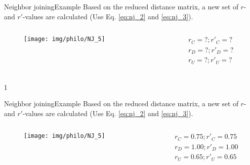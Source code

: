 \documentclass[10pt]{beamer}
\def\mysol{0}
\def\mysol{1}
\newcommand{\1}{
	\setbeamertemplate{background}{
		\texttt{[image: img/1]}
		\tikz[overlay] \fill[fill opacity=0.75,fill=white] (0,0) rectangle (-\paperwidth,\paperheight);
	}
}
\begin{document}
\begin{frame}{Neighbor joining}{Example}
	Based on the reduced distance matrix, a new set of $r$- and $r'$-values	are calculated (Use Eq. \ref{eq:nj_2} and \ref{eq:nj_3}). 
	
	\begin{columns}
		\begin{column}{0.48\textwidth}
			\begin{figure}
				\texttt{[image: img/philo/NJ\_5]}
			\end{figure}
		\end{column}
		\begin{column}{0.48\textwidth}
			\begin{equation*}
			\begin{split}
			r_C = ? ; r'_C = ?  \\
			r_D = ? ; r'_D = ? \\ 
			r_U = ? ; r'_U = ? \\ 
			\end{split}
			\end{equation*} 
		\end{column}
	\end{columns}
\end{frame}

\if\mysol1
\begin{frame}{Neighbor joining}{Example}
	Based on the reduced distance matrix, a new set of $r$- and $r'$-values	are calculated (Use Eq. \ref{eq:nj_2} and \ref{eq:nj_3}).
	 
	\begin{columns}
		\begin{column}{0.48\textwidth}
			\begin{figure}
				\texttt{[image: img/philo/NJ\_5]}
			\end{figure}
		\end{column}
		\begin{column}{0.48\textwidth}
			\begin{equation*}
			\begin{split}
			r_C = 0.75 ; r'_C = 0.75  \\
			r_D = 1.00 ; r'_D = 1.00 \\ 
			r_U = 0.65 ; r'_U = 0.65 \\ 
			\end{split}
			\end{equation*} 
		\end{column}
	\end{columns}
\end{frame}
\fi
\end{document}

